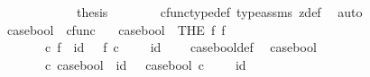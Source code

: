 \begin{isabellebody}
\ \ \ \ \isamarkupfalse%
\isanewline
\ \ \ \ \isamarkupfalse%
\ \isamarkupfalse%
\ {\isacharquery}{\kern0pt}thesis\isanewline
\ \ \ \ \ \ \isamarkupfalse%
\ cfunc{\isacharunderscore}{\kern0pt}type{\isacharunderscore}{\kern0pt}def\ type{\isacharunderscore}{\kern0pt}assms{\isacharparenleft}{\kern0pt}{}{\isacharparenright}{\kern0pt}\ z{\isacharunderscore}{\kern0pt}def\ \isamarkupfalse%
\ auto\isanewline
\ \isamarkupfalse%
\isanewline
{}\isamarkupfalse%
%
\endisatagproof
{\isafoldproof}%
%
\isadelimproof
%
\endisadelimproof
%
\isadelimdocument
%
\endisadelimdocument
%
\isatagdocument
%
\isamarkuptrue%
%
\endisatagdocument
{\isafolddocument}%
%
\isadelimdocument
%
\endisadelimdocument
{}\isamarkupfalse%
\ case{\isacharunderscore}{\kern0pt}bool\ {\isacharcolon}{\kern0pt}{\isacharcolon}{\kern0pt}\ {\isachardoublequoteopen}cfunc{\isachardoublequoteclose}\ \isanewline
\ \ {\isachardoublequoteopen}case{\isacharunderscore}{\kern0pt}bool\ {\isacharequal}{\kern0pt}\ {\isacharparenleft}{\kern0pt}THE\ f{\isachardot}{\kern0pt}\ f\ {\isacharcolon}{\kern0pt}\ {\isasymOmega}\ {\isasymrightarrow}\ {\isacharparenleft}{\kern0pt}{\isasymone}\ {\isasymCoprod}\ {\isasymone}{\isacharparenright}{\kern0pt}\ {\isasymand}\ \ \isanewline
\ \ \ \ {\isacharparenleft}{\kern0pt}{\isasymt}\ {\isasymamalg}\ {\isasymf}{\isacharparenright}{\kern0pt}\ {\isasymcirc}\isactrlsub c\ f\ {\isacharequal}{\kern0pt}\ id\ {\isasymOmega}\ {\isasymand}\ f\ {\isasymcirc}\isactrlsub c\ {\isacharparenleft}{\kern0pt}{\isasymt}\ {\isasymamalg}\ {\isasymf}{\isacharparenright}{\kern0pt}\ {\isacharequal}{\kern0pt}\ id\ {\isacharparenleft}{\kern0pt}{\isasymone}\ {\isasymCoprod}\ {\isasymone}{\isacharparenright}{\kern0pt}{\isacharparenright}{\kern0pt}{\isachardoublequoteclose}\isanewline
\isanewline
{}\isamarkupfalse%
\ case{\isacharunderscore}{\kern0pt}bool{\isacharunderscore}{\kern0pt}def{}{\isacharcolon}{\kern0pt}\isanewline
\ \ {\isachardoublequoteopen}case{\isacharunderscore}{\kern0pt}bool\ {\isacharcolon}{\kern0pt}\ {\isasymOmega}\ {\isasymrightarrow}\ {\isacharparenleft}{\kern0pt}{\isasymone}\ {\isasymCoprod}\ {\isasymone}{\isacharparenright}{\kern0pt}\ {\isasymand}\ \ \isanewline
\ \ \ \ {\isacharparenleft}{\kern0pt}{\isasymt}\ {\isasymamalg}\ {\isasymf}{\isacharparenright}{\kern0pt}\ {\isasymcirc}\isactrlsub c\ case{\isacharunderscore}{\kern0pt}bool\ {\isacharequal}{\kern0pt}\ id\ {\isasymOmega}\ {\isasymand}\ case{\isacharunderscore}{\kern0pt}bool\ {\isasymcirc}\isactrlsub c\ {\isacharparenleft}{\kern0pt}{\isasymt}\ {\isasymamalg}\ {\isasymf}{\isacharparenright}{\kern0pt}\ {\isacharequal}{\kern0pt}\ id\ {\isacharparenleft}{\kern0pt}{\isasymone}\ {\isasymCoprod}\ {\isasymone}{\isacharparenright}{\kern0pt}{\isachardoublequoteclose}\isanewline

\end{isabellebody}
